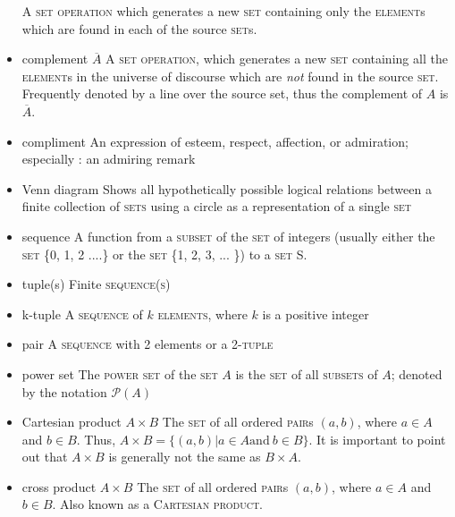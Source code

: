 \documentclass{article}
\newcommand{\term}[1]{\textsc{#1}}
\begin{document}
\begin{itemize}
  \subitem A \term{set operation} which generates a new \term{set} containing only the \term{element}s which are found in each of the source \term{set}s.
\item complement $\overline{A}$
  \subitem A \term{set operation}, which generates a new \term{set} containing all the \term{element}s in the universe of discourse which are \emph{not} found in the source \term{set}.  Frequently denoted by a line over the source set, thus the complement of $A$ is $\overline{A}$.
\item compliment
  \subitem An expression of esteem, respect, affection, or admiration; especially : an admiring remark %
\item Venn diagram
  \subitem Shows all hypothetically possible logical relations between a finite collection of \term{sets} using a circle as a representation of a single \term{set} %
\item sequence
  \subitem A function from a \term{subset} of the \term{set} of integers (usually either the \term{set} \{0, 1, 2 ....\} or the \term{set} \{1, 2, 3, ... \}) to a \term{set} S. 
\item tuple(s)
   \subitem Finite \term{sequence(s)}
\item k-tuple
   \subitem A \term{sequence} of $k$ \term{elements}, where $k$ is a positive integer
\item pair
   \subitem A \term{sequence} with 2 elements or a 2-\term{tuple}
\item power set 
  \subitem The \term{power set} of the \term{set} $A$ is the \term{set} of all \term{subsets} of $A$; denoted by the notation $\mathcal{P}\left(A\right)$

\item Cartesian product $A \times B$
  \subitem The \term{set} of all ordered \term{pair}s $(a, b)$, where $a \in A$ and $b \in B$. Thus, $A \times B = \{(a,b) | a\in A \text{and} \ b\in B\}$. It is important to point out that $A \times B$ is generally not the same as $B \times A$.

\item cross product $A \times B$
  \subitem The \term{set} of all ordered \term{pair}s $(a, b)$, where $a \in A$ and $b \in B$. Also known as a \term{Cartesian product}.


\end{itemize}
\end{document}
